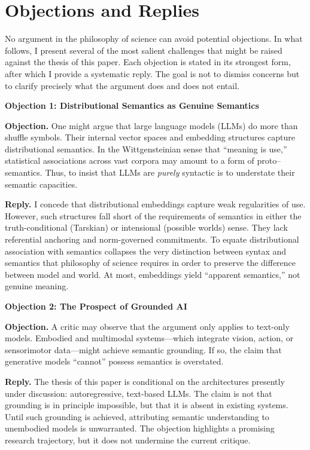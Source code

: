 \documentclass[12pt]{article}
\theoremstyle{plain}
\theoremstyle{definition}
\theoremstyle{remark}
\begin{document}
\section{Objections and Replies}

No argument in the philosophy of science can avoid potential objections. 
In what follows, I present several of the most salient challenges that might be raised 
against the thesis of this paper. Each objection is stated in its strongest form, 
after which I provide a systematic reply. The goal is not to dismiss concerns but to 
clarify precisely what the argument does and does not entail.

\noindent\textbf{Objection 1: Distributional Semantics as Genuine Semantics}

\textbf{Objection.} One might argue that large language models (LLMs) do more than 
shuffle symbols. Their internal vector spaces and embedding structures capture 
distributional semantics. In the Wittgensteinian sense that ``meaning is use,'' 
statistical associations across vast corpora may amount to a form of proto--semantics. 
Thus, to insist that LLMs are \emph{purely} syntactic is to understate their 
semantic capacities. 

\textbf{Reply.} I concede that distributional embeddings capture weak regularities of 
use. However, such structures fall short of the requirements of semantics in either 
the truth-conditional (Tarskian) or intensional (possible worlds) sense. They lack 
referential anchoring and norm-governed commitments. To equate 
distributional association with semantics collapses the very distinction between 
syntax and semantics that philosophy of science requires in order to preserve 
the difference between model and world. At most, embeddings yield 
``apparent semantics,'' not genuine meaning.

\noindent\textbf{Objection 2: The Prospect of Grounded AI}

\textbf{Objection.} A critic may observe that the argument only applies to 
text-only models. Embodied and multimodal systems---which integrate vision, 
action, or sensorimotor data---might achieve semantic grounding. If so, the claim 
that generative models ``cannot'' possess semantics is overstated.

\textbf{Reply.} The thesis of this paper is conditional on the architectures 
presently under discussion: autoregressive, text-based LLMs. The claim is not that 
grounding is in principle impossible, but that it is absent in existing systems. 
Until such grounding is achieved, attributing semantic understanding to 
unembodied models is unwarranted. The objection highlights a promising 
research trajectory, but it does not undermine the current critique.
\end{document}
